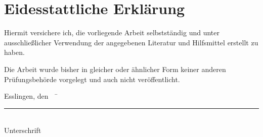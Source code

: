 \chapter*{Eidesstattliche Erklärung}

Hiermit versichere ich, die vorliegende Arbeit selbstständig und unter ausschließlicher Verwendung der angegebenen Literatur und Hilfsmittel erstellt zu haben.

Die Arbeit wurde bisher in gleicher oder ähnlicher Form keiner anderen Prüfungsbehörde vorgelegt und auch nicht veröffentlicht.

\begin{tabbing}
          Esslingen, den \workDatum~~\= \rule{5cm}{0.3mm}\\
                                                                                                    \> Unterschrift
\end{tabbing}
